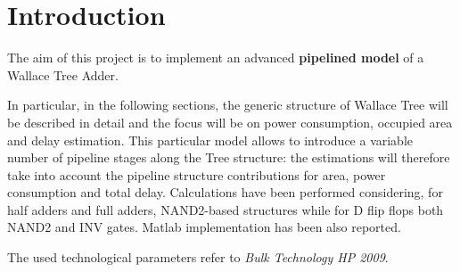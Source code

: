
\section{Introduction}
The aim of this project is to implement an advanced \textbf{pipelined model} of a Wallace Tree Adder.

In particular, in the following sections, the generic structure of Wallace Tree will be described in detail and the focus will be on power consumption, occupied area and delay estimation. This particular model allows to introduce a variable number of pipeline stages along the Tree structure: the estimations will therefore take into account the pipeline structure contributions for area, power consumption and total delay.
Calculations have been performed considering, for half adders and full adders, NAND2-based structures while for D flip flops both NAND2 and INV gates.
Matlab implementation has been also reported.

The used technological parameters refer to \textit{Bulk Technology HP 2009}.